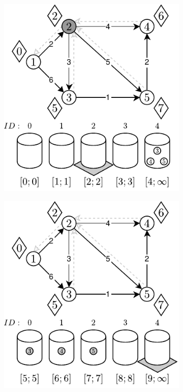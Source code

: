 \begin{figure}[!htbp]
\begin{subfigure}[b]{0.32\textwidth}
		\caption{}
	\end{subfigure}
	\begin{subfigure}[b]{0.32\textwidth}
		\includegraphics[width=\textwidth]{Chapter_II/OVERFLOW-BUCKET-Example/c.pdf}
		\caption{}
	\end{subfigure}
	\begin{subfigure}[b]{0.32\textwidth}
		\includegraphics[width=\textwidth]{Chapter_II/OVERFLOW-BUCKET-Example/d.pdf}

\end{subfigure}
\end{figure}
